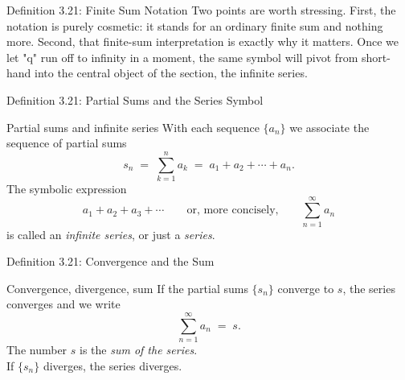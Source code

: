 \documentclass[aspectratio=169,12pt,t]{beamer}
\begin{document}
{\begin{frame}{Definition 3.21: Finite Sum Notation}
{    Two points are worth stressing. First, the notation is purely
    cosmetic: it stands for an ordinary finite sum and nothing
    more. Second, that finite-sum interpretation is exactly why it
    matters. Once we let "q" run off to infinity in a moment, the
    same symbol will pivot from short-hand into the central object
    of the section, the infinite series.
  }
\end{frame}

\begin{frame}{Definition 3.21: Partial Sums and the Series Symbol}
  \begin{defblock}{Partial sums and infinite series}
    With each sequence $\{a_n\}$ we associate the sequence of
    \alert{partial sums}
    \[
      s_n \;=\; \sum_{k=1}^{n} a_k \;=\; a_1 + a_2 + \cdots + a_n .
    \]
    The symbolic expression
    \begin{equation*}
      a_1 + a_2 + a_3 + \cdots \qquad\text{or, more concisely,}\qquad
      \sum_{n=1}^{\infty} a_n \tag{4}
    \end{equation*}
    is called an \emph{infinite series}, or just a \emph{series}.
  \end{defblock}

\end{frame}

\begin{frame}{Definition 3.21: Convergence and the Sum}
  \begin{defblock}{Convergence, divergence, sum}
    If the partial sums $\{s_n\}$ converge to $s$, the series
    \alert{converges} and we write
    \[
      \sum_{n=1}^{\infty} a_n \;=\; s .
    \]
    The number $s$ is the \emph{sum of the series}. \\[0.2em]
    If $\{s_n\}$ diverges, the series \alert{diverges}.
  \end{defblock}


\end{frame}}
\end{document}
